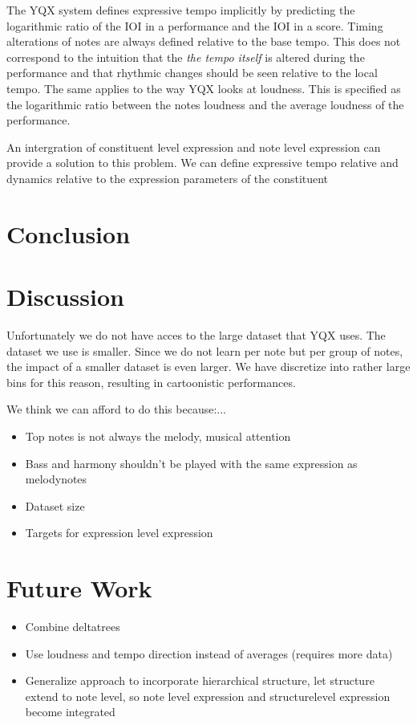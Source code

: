 \documentclass[a4paper,10pt]{article}
\begin{document}
The YQX system defines expressive tempo implicitly by predicting the logarithmic ratio of the IOI in a performance and the IOI in a score. Timing alterations of notes are always defined relative to the base tempo. This does not correspond to the intuition that the \textit{the tempo itself} is altered during the performance and that rhythmic changes should be seen relative to the local tempo. The same applies to the way YQX looks at loudness. This is specified as the logarithmic ratio between the notes loudness and the average loudness of the performance. 

An intergration of constituent level expression and note level expression can provide a solution to this problem. We can define expressive tempo relative and dynamics relative to the expression parameters of the constituent

\section{Conclusion}
\cite{markwin}
\section{Discussion}

Unfortunately we do not have acces to the large dataset that YQX uses. The dataset we use is smaller. Since we do not learn per note but per group of notes, the impact of a smaller dataset is even larger. We have discretize into rather large bins for this reason, resulting in cartoonistic performances. 

We think we can afford to do this because:...

\begin{itemize}
\item Top notes is not always the melody, musical attention
\item Bass and harmony shouldn't be played with the same expression as melodynotes
\item Dataset size
\item Targets for expression level expression
\end{itemize}

\section{Future Work}
\begin{itemize}
\item Combine deltatrees
\item Use loudness and tempo direction instead of averages (requires more data)
\item Generalize approach to incorporate hierarchical structure, let structure extend to note level, so note level expression and structurelevel expression become integrated
\end{itemize}
\end{document}
